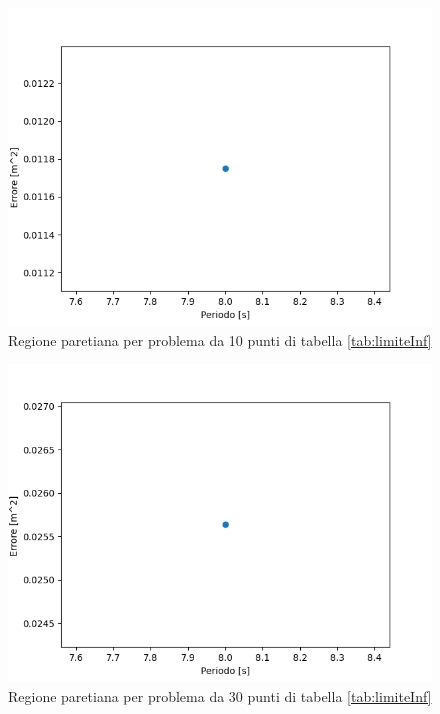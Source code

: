 \documentclass[a4paper,12pt]{report}
\begin{document}
\begin{itemize}
      \begin{figure}[H]
        \centering
        \includegraphics[scale=0.70]{img/puls08/standard20.png}
        \caption{Regione paretiana per problema da 10 punti di tabella \ref{tab:limiteInf}}
        \label{fig:reg_ammis_20_08_std}
      \end{figure}

      \begin{figure}[H]
        \centering
        \includegraphics[scale=0.70]{img/puls08/standard30.png}
        \caption{Regione paretiana per problema da 30 punti di tabella \ref{tab:limiteInf}}
        \label{fig:reg_ammis_30_08_std}
      \end{figure}

\end{itemize}
\end{document}
